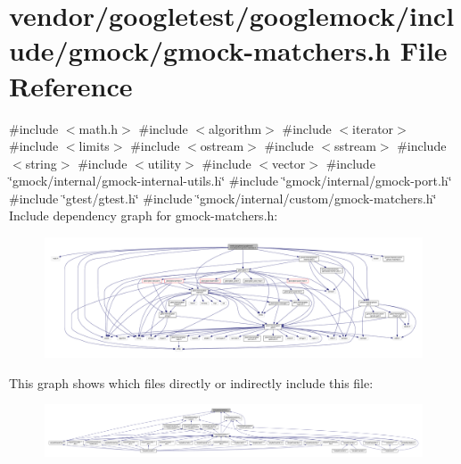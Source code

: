 \hypertarget{gmock-matchers_8h}{}\section{vendor/googletest/googlemock/include/gmock/gmock-\/matchers.h File Reference}
\label{gmock-matchers_8h}
{\ttfamily \#include $<$math.\+h$>$}\newline
{\ttfamily \#include $<$algorithm$>$}\newline
{\ttfamily \#include $<$iterator$>$}\newline
{\ttfamily \#include $<$limits$>$}\newline
{\ttfamily \#include $<$ostream$>$}\newline
{\ttfamily \#include $<$sstream$>$}\newline
{\ttfamily \#include $<$string$>$}\newline
{\ttfamily \#include $<$utility$>$}\newline
{\ttfamily \#include $<$vector$>$}\newline
{\ttfamily \#include \char`\"{}gmock/internal/gmock-\/internal-\/utils.\+h\char`\"{}}\newline
{\ttfamily \#include \char`\"{}gmock/internal/gmock-\/port.\+h\char`\"{}}\newline
{\ttfamily \#include \char`\"{}gtest/gtest.\+h\char`\"{}}\newline
{\ttfamily \#include \char`\"{}gmock/internal/custom/gmock-\/matchers.\+h\char`\"{}}\newline
Include dependency graph for gmock-\/matchers.h\+:
\nopagebreak
\begin{figure}[H]
\begin{center}
\leavevmode
\includegraphics[width=350pt]{gmock-matchers_8h__incl}
\end{center}
\end{figure}
This graph shows which files directly or indirectly include this file\+:
\nopagebreak
\begin{figure}[H]
\begin{center}
\leavevmode
\includegraphics[width=350pt]{gmock-matchers_8h__dep__incl}
\end{center}
\end{figure}
